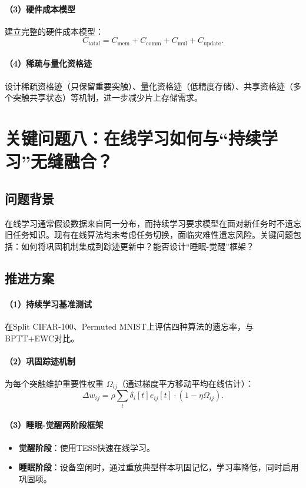\documentclass[journal,12pt,onecolumn]{IEEEtran}
\begin{document}
\paragraph{（3）硬件成本模型}
建立完整的硬件成本模型：
\[
C_{\text{total}} = C_{\text{mem}} + C_{\text{comm}} + C_{\text{mul}} + C_{\text{update}}.
\]

\paragraph{（4）稀疏与量化资格迹}
设计稀疏资格迹（只保留重要突触）、量化资格迹（低精度存储）、共享资格迹（多个突触共享状态）等机制，进一步减少片上存储需求。

\section{关键问题八：在线学习如何与“持续学习”无缝融合？}

\subsection{问题背景}

在线学习通常假设数据来自同一分布，而持续学习要求模型在面对新任务时不遗忘旧任务知识。现有在线算法均未考虑任务切换，面临灾难性遗忘风险。关键问题包括：如何将巩固机制集成到踪迹更新中？能否设计“睡眠-觉醒”框架？

\subsection{推进方案}

\paragraph{（1）持续学习基准测试}
在Split CIFAR-100、Permuted MNIST上评估四种算法的遗忘率，与BPTT+EWC对比。

\paragraph{（2）巩固踪迹机制}
为每个突触维护重要性权重 \(\Omega_{ij}\)（通过梯度平方移动平均在线估计）：
\[
\Delta w_{ij} = \rho \sum_t \delta_i[t] e_{ij}[t] \cdot (1 - \eta \Omega_{ij}).
\]

\paragraph{（3）睡眠-觉醒两阶段框架}
\begin{itemize}
    \item \textbf{觉醒阶段}：使用TESS快速在线学习。
    \item \textbf{睡眠阶段}：设备空闲时，通过重放典型样本巩固记忆，学习率降低，同时启用巩固项。
\end{itemize}
\end{document}
